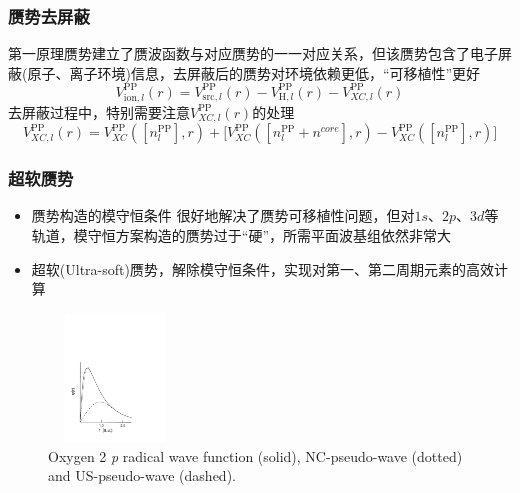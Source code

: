 \frame
{
	\frametitle{赝势去屏蔽}
	第一原理赝势建立了赝波函数与对应赝势的一一对应关系，但该赝势包含了电子屏蔽(原子、离子环境)信息，去屏蔽后的赝势对环境依赖更低，“可移植性”更好
	$$V_{\mathrm{ion},l}^{\mathrm{PP}}(r)=V_{\mathrm{src},l}^{\mathrm{PP}}(r)-V_{\mathrm{H},l}^{\mathrm{PP}}(r)-V_{XC,l}^{\mathrm{PP}}(r)$$
	去屏蔽过程中，特别需要注意$V_{XC,l}^{\mathrm{PP}}(r)$的处理
	$$V_{XC,l}^{\mathrm{PP}}(r)=V_{XC}^{\mathrm{PP}}([n_l^{\mathrm{PP}}],r)+\big[V_{XC}^{\mathrm{PP}}([n_l^{\mathrm{PP}}+n^{core}],r)-V_{XC}^{\mathrm{PP}}([n_l^{\mathrm{PP}}],r)\big]$$
}

\frame
{
\frametitle{超软赝势}
\begin{itemize}
\setlength{\itemsep}{5pt}
	\item 赝势构造的模守恒条件
	很好地解决了赝势可移植性问题，但对$1s$、$2p$、$3d$等轨道，模守恒方案构造的赝势过于“硬”，所需平面波基组依然非常大
	\item 超软\textrm{(Ultra-soft)}赝势，解除模守恒条件，实现对第一、第二周期元素的高效计算
\end{itemize}
\begin{figure}[h!]
\vspace*{-0.10in}
\centering
\includegraphics[height=1.35in,width=1.40in,viewport=30 55 415 500,clip]{Figures/Norm-US-wave.pdf}
\caption{\tiny \textrm{Oxygen 2} \textit{p} \textrm{radical wave function (solid), NC-pseudo-wave (dotted) and US-pseudo-wave (dashed).}}%
\label{Norm-US-wave}
\end{figure}
}

